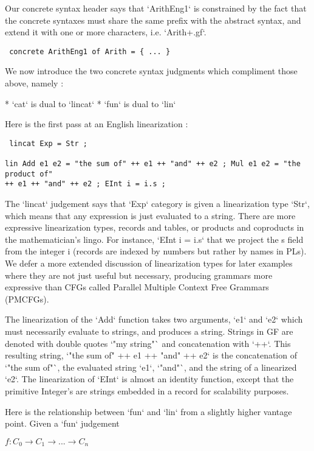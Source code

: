 \documentclass[11pt, a4paper]{article}
\begin{document}
Our concrete syntax header says that `ArithEng1` is constrained by the fact that
the concrete syntaxes must share the same prefix with the abstract syntax, and
extend it with one or more characters, i.e. `Arith+.gf`.

\begin{verbatim} concrete ArithEng1 of Arith = { ... }
\end{verbatim}

We now introduce the two concrete syntax judgments which compliment those above,
namely :

* `cat` is dual to `lincat` * `fun` is dual to `lin`

Here is the first pass at an English linearization :

\begin{verbatim} lincat Exp = Str ;

lin Add e1 e2 = "the sum of" ++ e1 ++ "and" ++ e2 ; Mul e1 e2 = "the product of"
++ e1 ++ "and" ++ e2 ; EInt i = i.s ;
\end{verbatim}

The `lincat` judgement says that `Exp` category is given a linearization type
`Str`, which means that any expression is just evaluated to a string. There are
more expressive linearization types, records and tables, or products and
coproducts in the mathematician's lingo. For instance, `EInt i = i.s` that we
project the s field from the integer i (records are indexed by numbers but
rather by names in PLs). We defer a more extended discussion of linearization
types for later examples where they are not just useful but necessary, producing
grammars more expressive than CFGs called Parallel Multiple Context Free
Grammars (PMCFGs).

The linearization of the `Add` function takes two arguments, `e1` and `e2` which
must necessarily evaluate to strings, and produces a string. Strings in GF are
denoted with double quotes `"my string"` and concatenation with `++`. This
resulting string, `"the sum of" ++ e1 ++ "and" ++ e2` is the concatenation of
`"the sum of"`, the evaluated string `e1`, `"and"`, and the string of a
linearized `e2`. The linearization of `EInt` is almost an identity function,
except that the primitive Integer's are strings embedded in a record for
scalability purposes.

Here is the relationship between `fun` and `lin` from a slightly higher vantage
point. Given a `fun` judgement

  $f {:} C_0 \rightarrow C_1 \rightarrow ... \rightarrow C_n$
\end{document}
